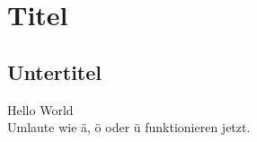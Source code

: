 \documentclass[a4paper, 10pt, fleqn]{article}
\begin{document}
\section{Titel}
\subsection{Untertitel}
Hello World
\\
Umlaute wie ä, ö oder ü funktionieren jetzt. 
\end{document}
